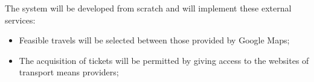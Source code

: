 The system will be developed from scratch and will implement these external services:
\begin{itemize}
\item Feasible travels will be selected between those provided by Google Maps;
\item The acquisition of tickets will be permitted by giving access to the websites of transport means providers;
\end{itemize}
